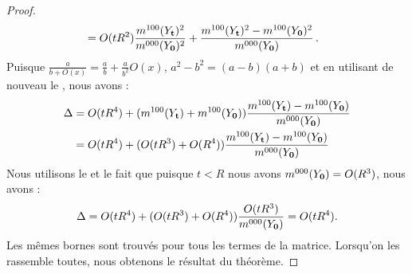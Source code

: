 \begin{proof}
\begin{align}
    &= O(tR^2)\frac{m^{100}(Y_{\mathbf{t}})^2}{m^{000}(Y_{\mathbf{0}})^2} +
    \frac{m^{100}(Y_{\mathbf{t}})^2 - m^{100}(Y_{\mathbf{0}})^2}{m^{000}(Y_{\mathbf{0}})}\,.
  \end{align}
  Puisque $\frac{a}{b+O(x)}=\frac{a}{b}+\frac{a}{b^2}O(x)$, $a^2-b^2=(a-b)(a+b)$
  et en utilisant de nouveau le , nous
  avons :
  \begin{align*}
    \Delta
    &= O(tR^4) + (m^{100}(Y_{\mathbf{t}}) + m^{100}(Y_{\mathbf{0}}))\frac{m^{100}(Y_{\mathbf{t}}) - m^{100}(Y_{\mathbf{0}})}{m^{000}(Y_{\mathbf{0}})} \\
    &= O(tR^4) + (O(tR^3)+O(R^4))\frac{m^{100}(Y_{\mathbf{t}}) - m^{100}(Y_{\mathbf{0}})}{m^{000}(Y_{\mathbf{0}})}
  \end{align*}
  Nous utilisons le  et le fait que
  puisque $t < R$ nous avons $m^{000}(Y_{\mathbf{0}}) = O(R^3)$, nous avons :
  \begin{equation}
    \Delta = O(tR^4) + (O(tR^3)+O(R^4))\frac{O(tR^3)}{m^{000}(Y_{\mathbf{0}})} = O(tR^4).
  \end{equation}
  Les mêmes bornes sont trouvés pour tous les termes de la matrice. Lorsqu'on
  les rassemble toutes, nous obtenons le résultat du théorème.
  \end{proof}
%
